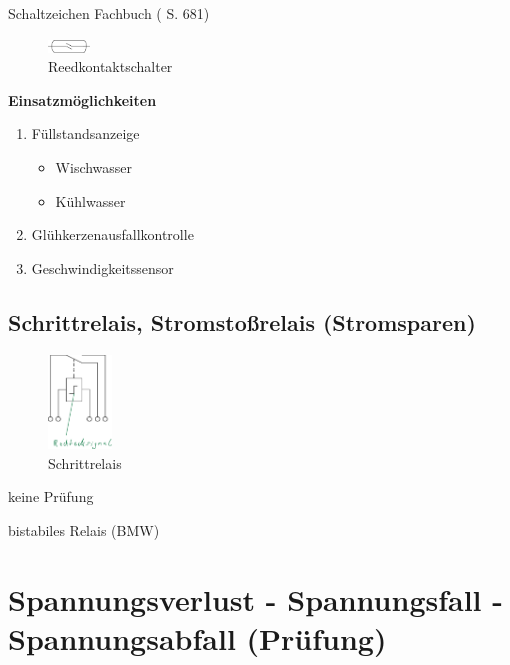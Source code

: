 Schaltzeichen Fachbuch (\textcite{brand:2020:fachkundeKfz} S. 681)

\begin{figure}[!ht]%
\centering
\includegraphics[width=0.1\textwidth]{images/Skizze/12_Reedkontaktschalter_Skizze.pdf}
\caption{Reedkontaktschalter}
\end{figure}

\textbf{Einsatzmöglichkeiten}

\begin{enumerate}
\item
  Füllstandsanzeige

  \begin{itemize}
  \item
    Wischwasser
  \item
    Kühlwasser
  \end{itemize}
\item
  Glühkerzenausfallkontrolle
\item
  Geschwindigkeitssensor
\end{enumerate}

\subsection{Schrittrelais, Stromstoßrelais
(Stromsparen)}\label{schrittrelais-stromstossrelais-stromsparen}

\begin{figure}[!ht]%
\centering
\includegraphics[width=0.15\textwidth]{images/Skizze/11_Schrittrelais_Skizze.pdf}
\caption{Schrittrelais}
\end{figure}

keine Prüfung

bistabiles Relais (BMW)

\newpage

\section{Spannungsverlust - Spannungsfall - Spannungsabfall
(Prüfung)}\label{spannungsverlust-spannungsfall-spannungsabfall-pruefung}


